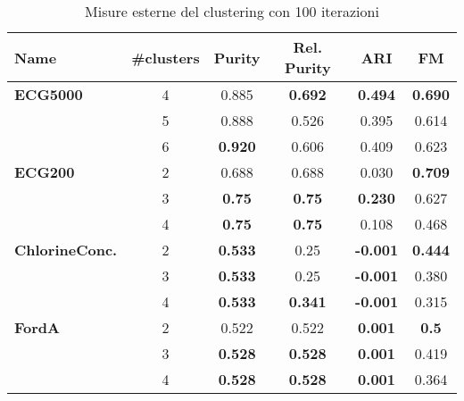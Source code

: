 \begin{table}[H]
	\centering
	\begin{tabularx}{\textwidth}{X | c c c c c}
		\hline
		\textbf{Name} & \textbf{\#clusters} & \textbf{Purity} & \textbf{Rel. Purity} & \textbf{ARI} & \textbf{FM}\\
		\hline
		\textbf{ECG5000} & 4 & 0.885 & \textbf{0.692} & \textbf{0.494} & \textbf{0.690} \\
		& 5 & 0.888 & 0.526 & 0.395 & 0.614 \\
		& 6 & \textbf{0.920} & 0.606 & 0.409 & 0.623 \\
		\hline
		\textbf{ECG200} & 2 & 0.688 & 0.688 & 0.030 & \textbf{0.709} \\
		& 3 & \textbf{0.75} & \textbf{0.75} & \textbf{0.230} & 0.627 \\
		& 4 & \textbf{0.75} & \textbf{0.75} & 0.108 & 0.468 \\
		\hline
		\textbf{ChlorineConc.} & 2 & \textbf{0.533} & 0.25 & \textbf{-0.001} & \textbf{0.444} \\
		& 3 & \textbf{0.533} & 0.25 & \textbf{-0.001} & 0.380 \\
		& 4 & \textbf{0.533} & \textbf{0.341} & \textbf{-0.001} & 0.315 \\
		\hline
		\textbf{FordA} & 2 & 0.522 & 0.522 & \textbf{0.001} & \textbf{0.5} \\
		& 3 & \textbf{0.528} & \textbf{0.528} & \textbf{0.001} & 0.419 \\
		& 4 & \textbf{0.528} & \textbf{0.528} & \textbf{0.001} & 0.364 \\
	\end{tabularx}
	\caption{Misure esterne del clustering con 100 iterazioni}
	\label{tab:clustering100_ext}
\end{table}